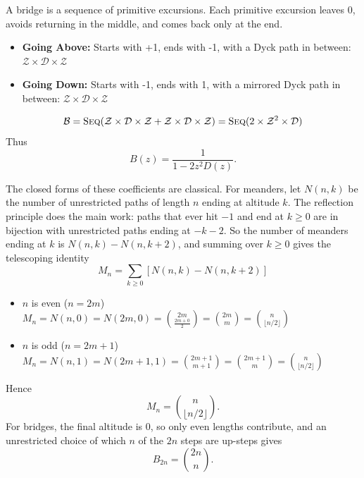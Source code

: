 A bridge is a sequence of primitive excursions. Each primitive excursion leaves 0, avoids returning in the middle, and comes back only at the end.
\begin{itemize}
    \item \textbf{Going Above:} Starts with +1, ends with -1, with a Dyck path in between: $\mathcal{Z} \times \mathcal{D} \times \mathcal{Z}$
    \item \textbf{Going Down:} Starts with -1, ends with 1, with a mirrored Dyck path in between: $\mathcal{Z} \times \mathcal{D} \times \mathcal{Z}$
\end{itemize}
\begin{equation*}
    \mathcal{B}
        = \mathrm{S}\textsc{eq}(\mathcal{Z} \times \mathcal{D} \times \mathcal{Z} + \mathcal{Z} \times \mathcal{D} \times \mathcal{Z})
        = \mathrm{S}\textsc{eq}(2 \times \mathcal{Z}^{2} \times \mathcal{D})
\end{equation*}
Thus
\begin{equation*}
    B(z) = \frac{1}{1 - 2z^{2}D(z)}.
\end{equation*}

The closed forms of these coefficients are classical. For meanders, let $N(n, k)$ be the
number of unrestricted paths of length $n$ ending at altitude $k$.
The reflection principle does the main work: paths that ever hit $-1$ and end at $k \geq 0$ are
in bijection with unrestricted paths ending at $-k - 2$.
So the number of meanders ending at $k$ is $N(n, k) - N(n, k + 2)$, and summing over $k \geq 0$ gives the telescoping identity
\begin{equation*}
    M_{n} = \sum_{k \geq 0} [N(n, k) - N(n, k + 2)]
\end{equation*}
\begin{itemize}
    \item $n$ is even ($n = 2m$)
        $M_{n} = N(n, 0) = N(2m, 0) = \binom{2m}{\frac{2m + 0}{2}} = \binom{2m}{m} = \binom{n}{\lfloor n/2 \rfloor}$
    \item $n$ is odd ($n = 2m + 1$)
        $M_{n} = N(n, 1) = N(2m + 1, 1) = \binom{2m + 1}{m + 1}
            = \binom{2m + 1}{m} = \binom{n}{\lfloor n/2 \rfloor}$
\end{itemize}
Hence
\begin{equation*}
    M_{n} = \binom{n}{\lfloor n/2 \rfloor}.
\end{equation*}
For bridges, the final altitude is $0$, so only even lengths contribute, and an unrestricted
choice of which $n$ of the $2n$ steps are up-steps gives
\begin{equation*}
    B_{2n} = \binom{2n}{n}.
\end{equation*}

